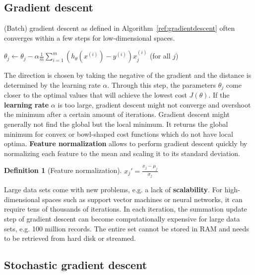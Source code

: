 \documentclass{report}
\newtheorem{definition}{Definition}[section]
\begin{document}
\subsection{Gradient descent}
\label{chapter:gradientdescent}
(Batch) gradient descent as defined in Algorithm~\ref{ref:gradientdescent} often converges within a few steps for low-dimensional spaces.

\begin{algorithm}
\caption{Batch gradient descent}
\label{ref:gradientdescent}
\begin{algorithmic}
\Repeat
{}
\State $\theta_j  \gets \theta_j - \alpha\frac{1}{m}\sum_{i=1}^m (h_\theta(x^{(i)})-y^{(i)})x_j^{(i)}$ (for all $j$)
\EndFor
{}
\end{algorithmic}
\end{algorithm}

The direction is chosen by taking the negative of the gradient and the distance is determined by the learning rate $\alpha$.
Through this step, the parameters $\theta_j$ come closer to the optimal values that will achieve the lowest cost $J(\theta)$.
If the {\bf learning rate} $\alpha$ is too large, gradient descent might not converge and overshoot the minimum after a certain amount of iterations.
Gradient descent might generally not find the global but the local minimum.
It returns the global minimum for convex or bowl-shaped cost functions which do not have local optima.
{\bf Feature normalization} allows to perform gradient descent quickly by normalizing each feature to the mean and scaling it to its standard deviation.

\begin{definition}[Feature normalization]
$x_j' = \frac{x_j - \mu_j}{\sigma_j}$
\end{definition}

Large data sets come with new problems, e.g. a lack of {\bf scalability}.
For high-dimensional spaces such as support vector machines or neural networks, it can require tens of thousands of iterations.
In each iteration, the summation update step of gradient descent can become computationally expensive for large data sets, e.g. 100 million records.
The entire set cannot be stored in RAM and needs to be retrieved from hard disk or streamed.


\subsection{Stochastic gradient descent}
\end{document}
